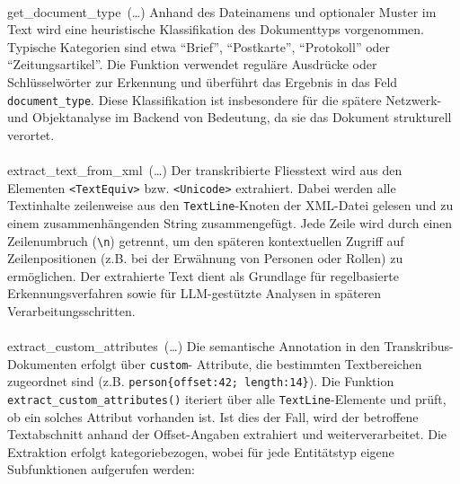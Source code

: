 \documentclass[12pt, a4paper, ngerman, bidi=default]{article}
\makeatletter
\newcommand{\code}[1]{\colorbox{VeryLightGray}{\texttt{#1}}} %
\let\oldparagraph\paragraph%
\renewcommand{\paragraph}{
    \@ifstar%
      \xxxParagraphStar%
      \xxxParagraphNoStar%
 }
\newcommand{\xxxParagraphStar}[1]{\oldparagraph*{#1}\mbox{}}
\newcommand{\xxxParagraphNoStar}[1]{\oldparagraph{#1}\mbox{}}
\makeatother
\begin{document}
\paragraph{get\_document\_type~(\dots)} Anhand des Dateinamens und optionaler Muster im Text wird eine heuristische Klassifikation 
des Dokumenttyps vorgenommen. Typische Kategorien sind etwa \enquote{Brief}, \enquote{Postkarte}, \enquote{Protokoll} oder 
\enquote{Zeitungsartikel}. Die Funktion verwendet reguläre Ausdrücke oder Schlüsselwörter zur Erkennung und überführt das Ergebnis 
in das Feld \code{document\_type}. Diese Klassifikation ist insbesondere für die spätere Netzwerk- und Objektanalyse im Backend von 
Bedeutung, da sie das Dokument strukturell verortet.

\paragraph{extract\_text\_from\_xml~(\dots)} Der transkribierte Fliesstext wird aus den Elementen \code{<TextEquiv>} bzw. 
\code{<Unicode>} extrahiert. Dabei werden alle Textinhalte zeilenweise aus den \code{TextLine}-Knoten der XML-Datei gelesen und zu 
einem zusammenhängenden String zusammengefügt. Jede Zeile wird durch einen Zeilenumbruch (\code{\textbackslash n}) getrennt, um den 
späteren kontextuellen Zugriff auf Zeilenpositionen (z.B. bei der Erwähnung von Personen oder Rollen) zu ermöglichen. Der extrahierte 
Text dient als Grundlage für regelbasierte Erkennungsverfahren sowie für LLM-gestützte Analysen in späteren Verarbeitungsschritten.

\paragraph{extract\_custom\_attributes~(\dots)} Die semantische Annotation in den Transkribus-Dokumenten erfolgt über \code{custom}-
Attribute, die bestimmten Textbereichen zugeordnet sind (z.B. \code{person\{offset:42; length:14\}}). Die Funktion 
\code{extract\_custom\_attributes()} iteriert über alle \code{TextLine}-Elemente und prüft, ob ein solches Attribut vorhanden ist. 
Ist dies der Fall, wird der betroffene Textabschnitt anhand der Offset-Angaben extrahiert und weiterverarbeitet. Die Extraktion 
erfolgt kategoriebezogen, wobei für jede Entitätstyp eigene Subfunktionen aufgerufen werden:
\end{document}
